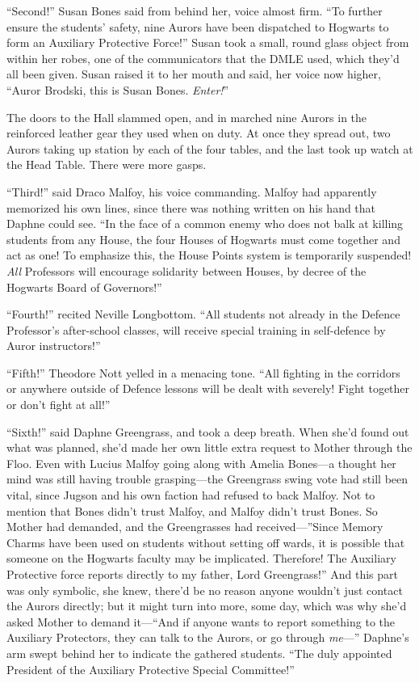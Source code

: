 “Second!” Susan Bones said from behind her, voice almost firm. “To further ensure the students’ safety, nine Aurors have been dispatched to Hogwarts to form an Auxiliary Protective Force!” Susan took a small, round glass object from within her robes, one of the communicators that the DMLE used, which they’d all been given. Susan raised it to her mouth and said, her voice now higher, “Auror Brodski, this is Susan Bones. \emph{Enter!}”

The doors to the Hall slammed open, and in marched nine Aurors in the reinforced leather gear they used when on duty. At once they spread out, two Aurors taking up station by each of the four tables, and the last took up watch at the Head Table. There were more gasps.

“Third!” said Draco Malfoy, his voice commanding. Malfoy had apparently memorized his own lines, since there was nothing written on his hand that Daphne could see. “In the face of a common enemy who does not balk at killing students from any House, the four Houses of Hogwarts must come together and act as one! To emphasize this, the House Points system is temporarily suspended! \emph{All} Professors will encourage solidarity between Houses, by decree of the Hogwarts Board of Governors!”

“Fourth!” recited Neville Longbottom. “All students not already in the Defence Professor’s after-school classes, will receive special training in self-defence by Auror instructors!”

“Fifth!” Theodore Nott yelled in a menacing tone. “All fighting in the corridors or anywhere outside of Defence lessons will be dealt with severely! Fight together or don’t fight at all!”

“Sixth!” said Daphne Greengrass, and took a deep breath. When she’d found out what was planned, she’d made her own little extra request to Mother through the Floo. Even with Lucius Malfoy going along with Amelia Bones—a thought her mind was still having trouble grasping—the Greengrass swing vote had still been vital, since Jugson and his own faction had refused to back Malfoy. Not to mention that Bones didn’t trust Malfoy, and Malfoy didn’t trust Bones. So Mother had demanded, and the Greengrasses had received—”Since Memory Charms have been used on students without setting off wards, it is possible that someone on the Hogwarts faculty may be implicated. Therefore! The Auxiliary Protective force reports directly to my father, Lord Greengrass!” And this part was only symbolic, she knew, there’d be no reason anyone wouldn’t just contact the Aurors directly; but it might turn into more, some day, which was why she’d asked Mother to demand it—“And if anyone wants to report something to the Auxiliary Protectors, they can talk to the Aurors, or go through \emph{me}—” Daphne’s arm swept behind her to indicate the gathered students. “The duly appointed President of the Auxiliary Protective Special Committee!”

